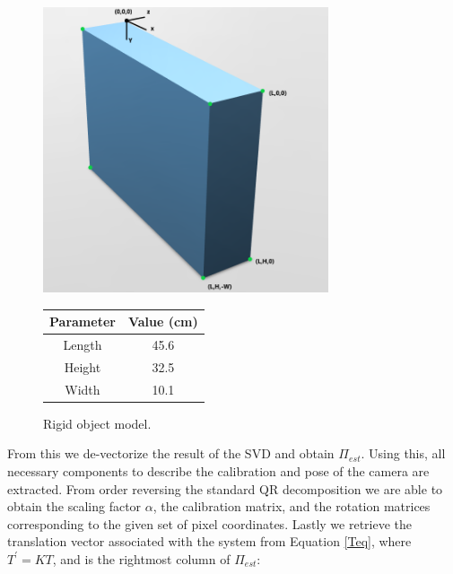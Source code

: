 \documentclass[12pt]{article}
\begin{document}
\begin{figure}[h]
	\centering %
	\captionsetup{justification=centering}
	\begin{minipage}{0.5\textwidth}
		\centering %
		\includegraphics[width=0.75\textwidth]{BoxModel.png}
		\caption{Rigid object model.} \label{box}
	\end{minipage}\hfill
	\begin{minipage}{0.5\textwidth}
		\begin{center}
			\begin{tabular}[5pt]{| c| c|}
				\hline
				Parameter	& Value (cm) \\[0.5ex] 
				\hline 	
				Length& 45.6  \\ \hline 
				Height& 32.5  \\ \hline 
				Width& 10.1  \\ \hline 
			\end{tabular}
			\label{boxdim}
		\end{center}	
	\end{minipage}
\end{figure}

\noindent From this we de-vectorize the result of the SVD and obtain $\Pi_{est}$. Using this, all necessary components to describe the calibration and pose of the camera are extracted. From order reversing the standard QR decomposition we are able to obtain the scaling factor $\alpha$, the calibration matrix, and the rotation matrices corresponding to the given set of pixel coordinates. Lastly we retrieve the translation vector associated with the system from Equation \ref{Teq}, where $T^{'} = KT$, and is the rightmost column of $\Pi_{est}$: \nolinebreak
\end{document}
